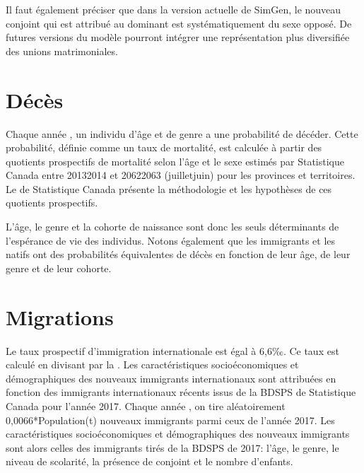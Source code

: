 \documentclass[letterpaper,10pt,french]{sphinxmanual}
\begin{document}
Il faut également préciser que dans la version actuelle de SimGen, le nouveau conjoint  qui est attribué au dominant  est systématiquement du sexe opposé. De futures versions du modèle pourront intégrer une représentation plus diversifiée des unions matrimoniales.


\section{Décès}
\label{\detokenize{transition_models:deces}}
Chaque année , un individu d’âge  et de genre  a une probabilité  de décéder. Cette probabilité, définie comme un taux de mortalité, est calculée à partir des quotients prospectifs de mortalité selon l’âge et le sexe estimés par Statistique Canada entre 2013\sphinxhyphen{}2014 et 2062\sphinxhyphen{}2063 (juillet\sphinxhyphen{}juin) pour les provinces et territoires. Le  de Statistique Canada présente la méthodologie et les hypothèses de ces quotients prospectifs.

L’âge, le genre et la cohorte de naissance sont donc les seuls déterminants de l’espérance de vie des individus. Notons également que les immigrants et les natifs ont des probabilités équivalentes de décès en fonction de leur âge, de leur genre et de leur cohorte.


\section{Migrations}
\label{\detokenize{transition_models:migrations}}
Le taux prospectif d’immigration internationale est égal à 6,6‰. Ce taux est calculé en divisant  par la . Les caractéristiques socio\sphinxhyphen{}économiques et démographiques des nouveaux immigrants internationaux sont attribuées en fonction des immigrants internationaux récents issus de la BDSPS de Statistique Canada pour l’année 2017. Chaque année , on tire aléatoirement 0,0066*Population(t) nouveaux immigrants parmi ceux de l’année 2017. Les caractéristiques socio\sphinxhyphen{}économiques et démographiques des nouveaux immigrants sont alors celles des immigrants tirés de la BDSPS de 2017: l’âge, le genre, le niveau de scolarité, la présence de conjoint et le nombre d’enfants.
\end{document}
